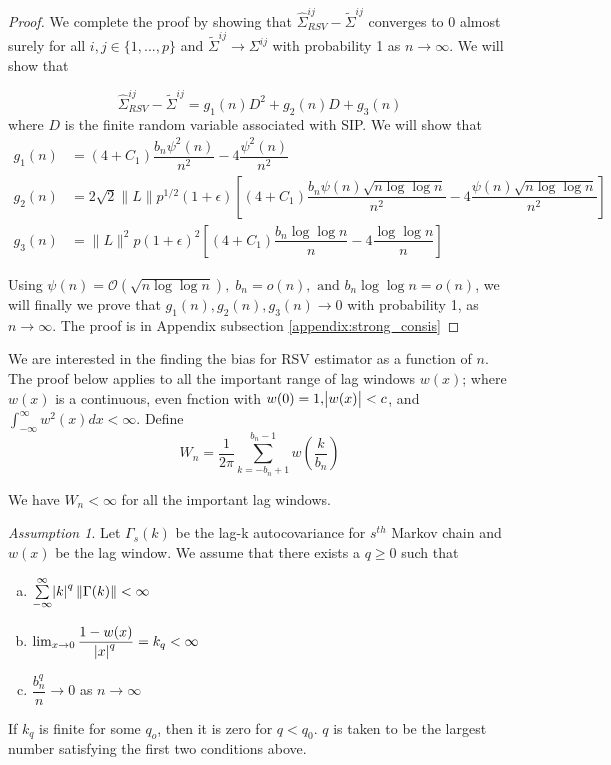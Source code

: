 \documentclass[11pt]{article}
\theoremstyle{remark}
\newtheorem{ass}{Assumption}
\begin{document}
\begin{proof}
We complete the proof by showing that $\hat{\Sigma}_{RSV}^{ij} - \tilde{\Sigma}^{ij}$ converges to 0 almost surely for all $i,j \in \{1,...,p\}$ and $\tilde{\Sigma}^{ij} \to \Sigma^{ij}$ with probability 1 as $n \to \infty$. We will show that 

\[
\hat{\Sigma}_{RSV}^{ij} - \tilde{\Sigma}^{ij} = g_1(n)D^2 + g_2(n)D + g_3(n)
\]
where $D$ is the finite random variable associated with SIP. We will show that
\begin{align*}
    g_1(n) &= (4+C_1)\dfrac{b_n \psi^2(n)}{n^2} - 4\dfrac{\psi^2(n)}{n^2}\\
    g_2(n) &= 2\sqrt{2}\|L\|p^{1/2}(1+\epsilon)\left[(4+C_1)\dfrac{b_n\psi(n)\sqrt{n\log \log n}}{n^2} - 4\dfrac{\psi(n)\sqrt{n\log \log n}}{n^2}\right]\\
    g_3(n) &= \|L\|^2 p (1+\epsilon)^2\left[(4+C_1)\dfrac{b_n \log\log n}{n} - 4 \dfrac{\log \log n}{n}\right]
\end{align*}

Using $\psi(n) = \mathcal{O}(\sqrt{n \log \log n}),\; b_n = o(n), \textrm{ and } b_n \log \log n = o(n)$, we will finally we prove that $g_1(n), g_2(n), g_3(n) \to 0$ with probability 1, as $n \to \infty$. The proof is in Appendix subsection \ref{appendix:strong_consis}
\end{proof}

We are interested in the finding the bias for RSV estimator as a function of $n$. The proof below applies to all the important range of lag windows $w(x)$; where $w(x)$ is a continuous, even fnction with $w(0)=1, \abs{w(x)} < c$, and $\int_{-\infty}^{\infty}w^2(x)dx < \infty$. Define
%
\[
W_n = \dfrac{1}{2\pi}\sum_{k=-b_n+1}^{b_n-1}w\left(\dfrac{k}{b_n}\right)
\]

We have $W_n < \infty$ for all the important lag windows.

\begin{ass} \label{ass:bias}
    Let $\Gamma_s(k)$ be the lag-k autocovariance for $s^{th}$ Markov chain and $w(x)$ be the lag window. We assume that there exists a $q \geq 0$ such that
    \begin{enumerate} [a.]
        \item $\sum\limits_{-\infty}^{\infty}\abs{k}^q \|\Gamma(k)\| < \infty$
        \item $\lim _{x \to 0}\dfrac{1 - w(x)}{\abs{x}^q} = k_q < \infty$
        \item $\dfrac{b_n^q}{n} \to 0$ as $n \to \infty$
    \end{enumerate}
    
    If $k_q$ is finite for some $q_o$, then it is zero for $q < q_0$. $q$ is taken to be the largest number satisfying the first two conditions above.
\end{ass}
\end{document}
